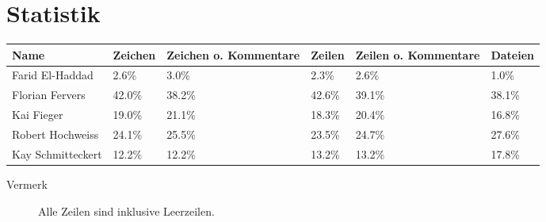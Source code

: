 \section{Statistik}

\begin{center}
    \begin{tabular}{ | l | l | l | l | l | l |}
    \hline
    Name & Zeichen & Zeichen o. Kommentare & Zeilen & Zeilen o. Kommentare & Dateien \\ \hline
    Farid El-Haddad & 2.6\% & 3.0\% & 2.3\% & 2.6\% & 1.0\% \\ \hline
    Florian Fervers & 42.0\% & 38.2\% & 42.6\% & 39.1\% & 38.1\% \\ \hline
    Kai Fieger & 19.0\% & 21.1\% & 18.3\% & 20.4\% & 16.8\% \\ \hline
    Robert Hochweiss & 24.1\% & 25.5\% & 23.5\% & 24.7\% & 27.6\% \\ \hline
    Kay Schmitteckert & 12.2\% & 12.2\% & 13.2\% & 13.2\% & 17.8\% \\ \hline
    \end{tabular}
    
    \begin{description}
    \item[Vermerk] Alle Zeilen sind inklusive Leerzeilen.
    \end{description}
\end{center}